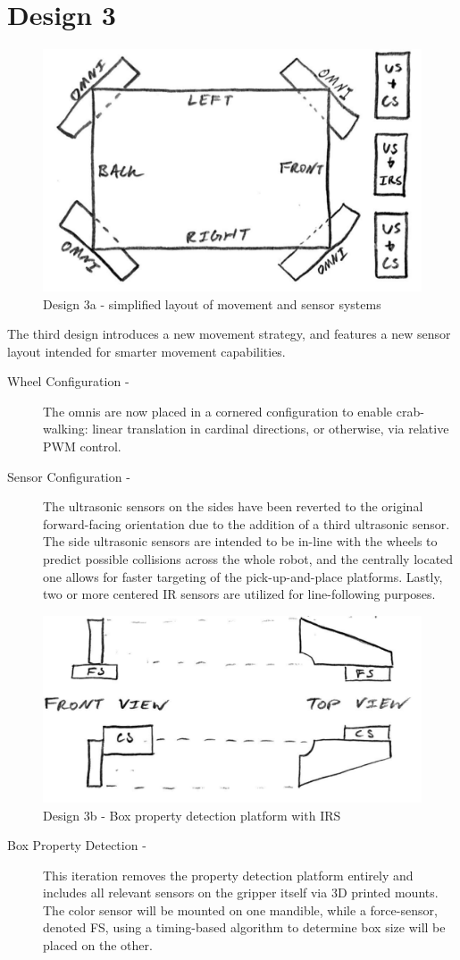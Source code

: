 \documentclass[11pt]{report}
\begin{document}
\section{Design 3}\label{sec:design3}
\begin{figure}[H]
    \centering
    \includegraphics[width=0.5\linewidth]{Images//Designs/Design3a.pdf}
    \caption{Design 3a - simplified layout of movement and sensor systems}
    \label{fig:design3a}
\end{figure}
The third design introduces a new movement strategy, and features a new sensor layout intended for smarter movement capabilities.
\begin{description}
    \item[Wheel Configuration - ]The \glspl{omni} are now placed in a cornered configuration to enable crab-walking: linear translation in cardinal directions, or otherwise, via relative \gls{PWM} control.
    \item[Sensor Configuration - ]The ultrasonic sensors on the sides have been reverted to the original forward-facing orientation due to the addition of a third ultrasonic sensor. The side ultrasonic sensors are intended to be in-line with the wheels to predict possible collisions across the whole robot, and the centrally located one allows for faster targeting of the pick-up-and-place platforms. Lastly, two or more centered \gls{IR} sensors are utilized for line-following purposes.
\end{description}
\begin{figure}[H]
    \centering
    \includegraphics[width=0.5\linewidth]{Images//Designs/Design3b.pdf}
    \caption{Design 3b - Box property detection platform with \gls{IRS}}
    \label{fig:design3b}
\end{figure}
\begin{description}
    \item[Box Property Detection - ]This iteration removes the property detection platform entirely and includes all relevant sensors on the gripper itself via 3D printed mounts. The color sensor will be mounted on one mandible, while a force-sensor, denoted \gls{FS}, using a timing-based algorithm to determine box size will be placed on the other.
\end{description}
\end{document}
